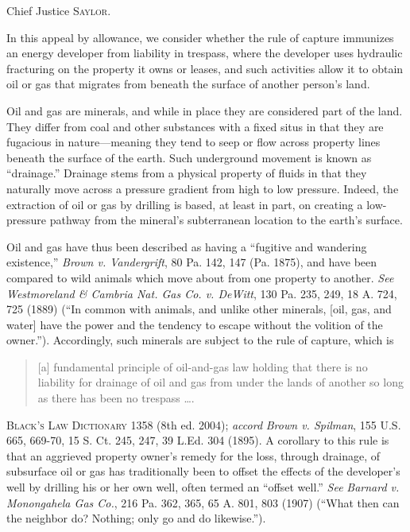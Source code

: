 

\opinion Chief Justice \textsc{Saylor}.

In this appeal by allowance, we consider whether the rule of capture immunizes
an energy developer from liability in trespass, where the developer uses
hydraulic fracturing on the property it owns or leases, and such activities
allow it to obtain oil or gas that migrates from beneath the surface of another
person's land.


Oil and gas are minerals, and while in place they are considered part of the
land. They differ from coal and other substances with a fixed situs in that they
are fugacious in nature---meaning they tend to seep or flow across property
lines beneath the surface of the earth. Such underground movement is known as
``drainage.'' Drainage stems from a physical property of fluids in that they
naturally move across a pressure gradient from high to low pressure. Indeed, the
extraction of oil or gas by drilling is based, at least in part, on creating a
low-pressure pathway from the mineral's subterranean location to the earth's
surface.

Oil and gas have thus been described as having a ``fugitive and wandering
existence,'' \textit{Brown v. Vandergrift}, 80 Pa. 142, 147 (Pa. 1875), and have
been compared to wild animals which move about from one property to another.
\textit{See} \textit{Westmoreland \& Cambria Nat. Gas Co. v. DeWitt}, 130 Pa.
235, 249, 18 A. 724, 725 (1889) (``In common with animals, and unlike other
minerals, [oil, gas, and water] have the power and the tendency to escape
without the volition of the owner.''). Accordingly, such minerals are subject to
the rule of capture, which is
\begin{quote}
[a] fundamental principle of oil-and-gas law holding that there is no liability
for drainage of oil and gas from under the lands of another so long as there has
been no trespass \ldots.
\end{quote}
\textsc{Black's Law Dictionary} 1358 (8th ed. 2004); \textit{accord}
\textit{Brown v. Spilman}, 155 U.S. 665, 669-70, 15 S. Ct. 245, 247, 39 L.Ed.
304 (1895). A corollary to this rule is that an
aggrieved property owner's remedy for the loss, through drainage, of subsurface
oil or gas has traditionally been to offset the effects of the developer's well
by drilling his or her own well, often termed an ``offset well.'' \textit{See}
\textit{Barnard v. Monongahela Gas Co.}, 216 Pa. 362, 365, 65 A. 801, 803 (1907)
(``What then can the neighbor do? Nothing; only go and do likewise.'').


